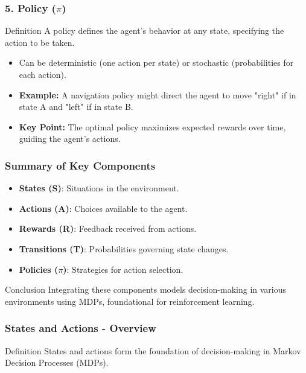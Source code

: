 \documentclass[aspectratio=169]{beamer}
\begin{document}
\begin{frame}[fragile]
    \frametitle{5. Policy (\(\pi\))}
    \begin{block}{Definition}
        A policy defines the agent's behavior at any state, specifying the action to be taken.
    \end{block}
    \begin{itemize}
        \item Can be deterministic (one action per state) or stochastic (probabilities for each action).
        \item \textbf{Example:} A navigation policy might direct the agent to move "right" if in state A and "left" if in state B.
        \item \textbf{Key Point:} The optimal policy maximizes expected rewards over time, guiding the agent's actions.
    \end{itemize}
\end{frame}

\begin{frame}[fragile]
    \frametitle{Summary of Key Components}
    \begin{itemize}
        \item \textbf{States (S)}: Situations in the environment.
        \item \textbf{Actions (A)}: Choices available to the agent.
        \item \textbf{Rewards (R)}: Feedback received from actions.
        \item \textbf{Transitions (T)}: Probabilities governing state changes.
        \item \textbf{Policies (\(\pi\))}: Strategies for action selection.
    \end{itemize}
    \vspace{10pt}
    \begin{block}{Conclusion}
        Integrating these components models decision-making in various environments using MDPs, foundational for reinforcement learning.
    \end{block}
\end{frame}

\begin{frame}[fragile]
    \frametitle{States and Actions - Overview}
    \begin{block}{Definition}
        States and actions form the foundation of decision-making in Markov Decision Processes (MDPs).
    \end{block}
\end{frame}
\end{document}
